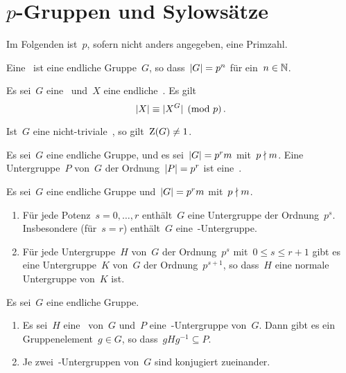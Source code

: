 \clearpage





\section{\texorpdfstring{$p$}{p}-Gruppen und Sylowsätze}

\begin{convention}
  Im Folgenden ist~$p$, sofern nicht anders angegeben, eine Primzahl.
\end{convention}

\begin{definition}
  Eine~ ist eine endliche Gruppe~$G$, so dass~$\lvert G\rvert = p^n$ für ein~$n \in \mathbb{N}$.
\end{definition}

\begin{proposition}
  Es sei~$G$ eine~ und~$X$ eine endliche~.
  Es gilt
  \[
    \lvert X\rvert \equiv \lvert X^G\rvert \pmod{p} \,.  
  \]
\end{proposition}

\begin{corollary}
  Ist~$G$ eine nicht-triviale~, so gilt~$\operatorname{Z}(G) \neq 1$.
\end{corollary}

\begin{definition}
  Es sei~$G$ eine endliche Gruppe, und es sei~$\lvert G\rvert = p^r m$ mit~$p \nmid m$.
  Eine Untergruppe~$P$ von~$G$ der Ordnung~$\lvert P\rvert = p^r$ ist eine~.
\end{definition}

\begin{theorem}
  Es sei~$G$ eine endliche Gruppe und~$\lvert G\rvert = p^r m$ mit~$p \nmid m$.
  \begin{enumerate}
    \item
      Für jede Potenz~$s = 0, \dotsc, r$ enthält~$G$ eine Untergruppe der Ordnung~$p^s$.
      Insbesondere (für~$s = r$) enthält~$G$ eine~-Untergruppe.
    \item
      Für jede Untergruppe~$H$ von~$G$ der Ordnung~$p^s$ mit~$0 \leq s \leq r+1$ gibt es eine Untergruppe~$K$ von~$G$ der Ordnung~$p^{s+1}$, so dass~$H$ eine normale Untergruppe von~$K$ ist.
  \end{enumerate}
\end{theorem}

\begin{theorem}
  Es sei~$G$ eine endliche Gruppe.
  \begin{enumerate}
    \item
      Es sei~$H$ eine~ von~$G$ und~$P$ eine~-Untergruppe von~$G$.
      Dann gibt es ein Gruppenelement~$g \in G$, so dass~$g H g^{-1} \subseteq P$.
    \item
      Je zwei~-Untergruppen von~$G$ sind konjugiert zueinander.
  \end{enumerate}
\end{theorem}

